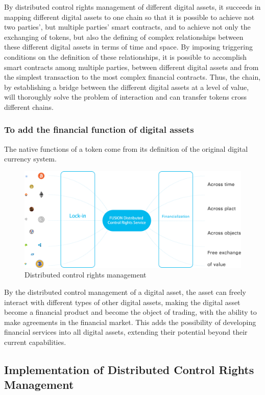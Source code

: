 \documentclass[a4paper,12pt]{article}
\begin{document}
By distributed control rights management of different digital assets, it succeeds in mapping different digital assets to one chain so that it is possible to achieve not two parties', but multiple parties' smart contracts, and to achieve not only the exchanging of tokens, but also the defining of complex relationships between these different digital assets in terms of time and space. By imposing triggering conditions on the definition of these relationships, it is possible to accomplish smart contracts among multiple parties, between different digital assets and from the simplest transaction to the most complex financial contracts. Thus, the chain, by establishing a bridge between the different digital assets at a level of value, will thoroughly solve the problem of interaction and can transfer tokens cross different chains.

\subsubsection{To add the financial function of digital assets}

The native functions of a token come from its definition of the original digital currency system.

\begin{figure} [htbp]
\centering \includegraphics [width = 5in]{pic/custoday.png}
\caption{Distributed control rights management} \label{fig: 1}
\end{figure}

By the distributed control management of a digital asset, the asset can freely interact with different types of other digital assets, making the digital asset become a financial product and become the object of trading, with the ability to make agreements in the financial market. This adds the possibility of developing financial services into all digital assets, extending their potential beyond their current capabilities.

\subsection{Implementation of Distributed Control Rights Management}
\end{document}
